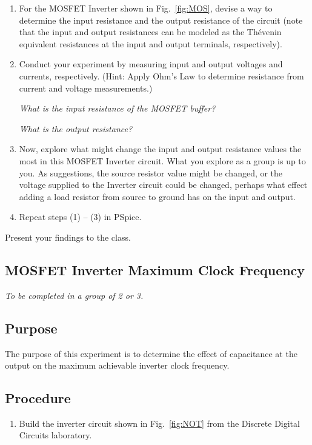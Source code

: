 \documentclass[12pt]{../manual}
\begin{document}
\begin{enumerate}
\item For the MOSFET Inverter shown in Fig.~\ref{fig:MOS}, devise a way to determine the input resistance and the output resistance of the circuit (note that the input and output resistances can be modeled as the Th\'evenin equivalent resistances at the input and output terminals, respectively).

\item Conduct your experiment by measuring input and output voltages and currents, respectively. (Hint: Apply Ohm's Law to determine resistance from current and voltage measurements.)

{\it What is the input resistance of the MOSFET buffer?}

{\it What is the output resistance?}

\item Now, explore what might change the input and output resistance values the most in this MOSFET Inverter circuit. What you explore as a group is up to you. As suggestions, the source resistor value might be changed, or the voltage supplied to the Inverter circuit could be changed, perhaps what effect adding a load resistor from source to ground has on the input and output.

\item Repeat steps (1) -- (3) in PSpice.
\end{enumerate}

Present your findings to the class.

\newpage
\subsection{MOSFET Inverter Maximum Clock Frequency}
\textit{To be completed in a group of 2 or 3.}

\subsection*{Purpose}

The purpose of this experiment is to determine the effect of capacitance at the output on the maximum achievable inverter clock frequency.

\subsection*{Procedure}

\begin{enumerate}
\item Build the inverter circuit shown in Fig.~\ref{fig:NOT} from the Discrete Digital Circuits laboratory.
\end{enumerate}
\end{document}
